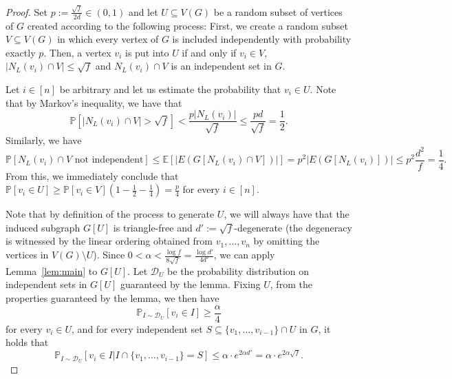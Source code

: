 \documentclass[10pt]{amsart}
\theoremstyle{definition}
\begin{document}
    \begin{proof}
    Set $p:=\frac{\sqrt{f}}{2d}\in (0,1)$ and let $U\subseteq V(G)$ be a random subset of vertices of $G$ created according to the following process: First, we create a random subset $V\subseteq V(G)$ in which every vertex of $G$ is included independently with probability exactly $p$. Then, a vertex $v_i$ is put into $U$ if and only if $v_i\in V$, $|N_L(v_i)\cap V|\le \sqrt{f}$ and $N_L(v_i)\cap V$ is an independent set in $G$. 

    Let $i\in [n]$ be arbitrary and let us estimate the probability that $v_i\in U$. Note that by Markov's inequality, we have that
    $$\mathbb{P}[|N_L(v_i)\cap V|>\sqrt{f}]<\frac{p|N_L(v_i)|}{\sqrt{f}}\le \frac{
pd}{\sqrt{f}}=\frac{1}{2}.$$
Similarly, we have
$$\mathbb{P}[N_L(v_i)\cap V \text{ not independent}]\le \mathbb{E}[|E(G[N_L(v_i)\cap V])|]=p^2|E(G[N_L(v_i)])|\le p^2\frac{d^2}{f}=\frac{1}{4}.$$
From this, we immediately conclude that $\mathbb{P}[v_i\in U]\ge \mathbb{P}[v_i\in V](1-\frac{1}{2}-\frac{1}{4})=\frac{p}{4}$ for every $i\in [n]$. 
    
    Note that by definition of the process to generate $U$, we will always have that the induced subgraph $G[U]$ is triangle-free and $d':=\sqrt{f}$-degenerate (the degeneracy is witnessed by the linear ordering obtained from $v_1,\ldots,v_n$ by omitting the vertices in $V(G)\setminus U$). Since $0<\alpha<\frac{\log f}{8\sqrt{f}}= \frac{\log d'}{4d'}$, we can apply Lemma~\ref{lem:main} to $G[U]$. Let $\mathcal{D}_U$ be the probability distribution on independent sets in $G[U]$ guaranteed by the lemma. Fixing $U$, from the properties guaranteed by the lemma, we then have
    $$\mathbb{P}_{I\sim \mathcal{D}_U}[v_i\in I]\ge \frac{\alpha}{4}$$ for every $v_i\in U$, and for every independent set $S\subseteq \{v_1,\ldots,v_{i-1}\}\cap U$ in $G$, it holds that
    $$\mathbb{P}_{I\sim \mathcal{D}_U}[v_i\in I|I\cap \{v_1,\ldots,v_{i-1}\}=S]\le \alpha\cdot e^{2\alpha d'}=\alpha\cdot e^{2\alpha\sqrt{f}}.$$


\end{proof}
\end{document}
